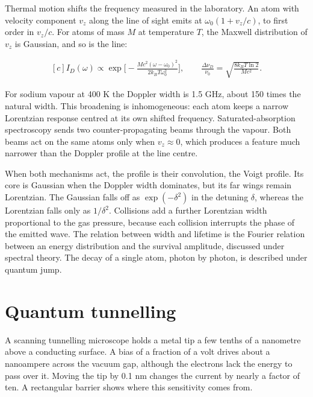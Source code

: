 \documentclass[11pt,oneside]{book}
\newenvironment{centeredalign}{\[\begin{gathered}[c]}{\end{gathered}\]}
\begin{document}
Thermal motion shifts the frequency measured in the laboratory. An atom with velocity component \(v_z\) along the line of sight emits at \(\omega_0(1+v_z/c)\), to first order in \(v_z/c\). For atoms of mass \(M\) at temperature \(T\), the Maxwell distribution of \(v_z\) is Gaussian, and so is the line:

\begin{centeredalign}
I_D(\omega)\propto\exp\Big[-\frac{Mc^2(\omega-\omega_0)^2}{2k_BT\omega_0^2}\Big],\qquad
\frac{\Delta\nu_D}{\nu_0}=\sqrt{\frac{8k_BT\ln2}{Mc^2}}.
\end{centeredalign}

For sodium vapour at 400 K the Doppler width is 1.5 GHz, about 150 times the natural width. This broadening is inhomogeneous: each atom keeps a narrow Lorentzian response centred at its own shifted frequency. Saturated-absorption spectroscopy sends two counter-propagating beams through the vapour. Both beams act on the same atoms only when \(v_z\approx0\), which produces a feature much narrower than the Doppler profile at the line centre.

When both mechanisms act, the profile is their convolution, the Voigt profile. Its core is Gaussian when the Doppler width dominates, but its far wings remain Lorentzian. The Gaussian falls off as \(\exp(-\delta^2)\) in the detuning \(\delta\), whereas the Lorentzian falls only as \(1/\delta^2\). Collisions add a further Lorentzian width proportional to the gas pressure, because each collision interrupts the phase of the emitted wave. The relation between width and lifetime is the Fourier relation between an energy distribution and the survival amplitude, discussed under spectral theory. The decay of a single atom, photon by photon, is described under quantum jump.







\clearpage

\section{Quantum tunnelling}

\label{topic:quantum-tunnelling}

A scanning tunnelling microscope holds a metal tip a few tenths of a nanometre above a conducting surface. A bias of a fraction of a volt drives about a nanoampere across the vacuum gap, although the electrons lack the energy to pass over it. Moving the tip by 0.1 nm changes the current by nearly a factor of ten. A rectangular barrier shows where this sensitivity comes from.
\end{document}
